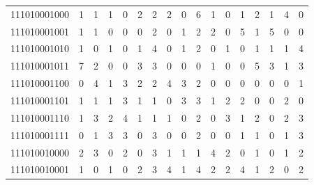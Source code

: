 \documentclass[10pt,a4paper]{article}
\begin{document}
\begin{longtable}{ |c|c|c|c|c|c|c|c|c|c|c|c|c|c|c|c|c| }
    111010001000              & 1                            & 1                                & 1                            & 0                              & 2   & 2   & 2   & 0   & 6   & 1   & 0   & 1   & 2   & 1   & 4   & 0   \\
    111010001001              & 1                            & 1                                & 0                            & 0                              & 0   & 2   & 0   & 1   & 2   & 2   & 0   & 5   & 1   & 5   & 0   & 0   \\
    111010001010              & 1                            & 0                                & 1                            & 0                              & 1   & 4   & 0   & 1   & 2   & 0   & 1   & 0   & 1   & 1   & 1   & 4   \\
    111010001011              & 7                            & 2                                & 0                            & 0                              & 3   & 3   & 0   & 0   & 0   & 1   & 0   & 0   & 5   & 3   & 1   & 3   \\
    111010001100              & 0                            & 4                                & 1                            & 3                              & 2   & 2   & 4   & 3   & 2   & 0   & 0   & 0   & 0   & 0   & 0   & 1   \\
    111010001101              & 1                            & 1                                & 1                            & 3                              & 1   & 1   & 0   & 3   & 3   & 1   & 2   & 2   & 0   & 0   & 2   & 0   \\
    111010001110              & 1                            & 3                                & 2                            & 4                              & 1   & 1   & 1   & 0   & 2   & 0   & 3   & 1   & 2   & 0   & 2   & 3   \\
    111010001111              & 0                            & 1                                & 3                            & 3                              & 0   & 3   & 0   & 0   & 2   & 0   & 0   & 1   & 1   & 0   & 1   & 3   \\
    111010010000              & 2                            & 3                                & 0                            & 2                              & 0   & 3   & 1   & 1   & 1   & 4   & 2   & 0   & 1   & 0   & 1   & 2   \\
    111010010001              & 1                            & 0                                & 1                            & 0                              & 2   & 3   & 4   & 1   & 4   & 2   & 2   & 4   & 1   & 2   & 0   & 2   \\

\end{longtable}
\end{document}
